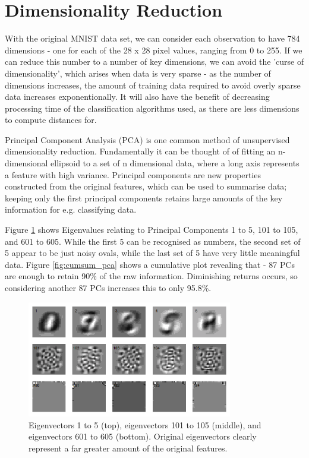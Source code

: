 \documentclass[11pt]{article} %
\begin{document}
\section{Dimensionality Reduction}

With the original MNIST data set, we can consider each observation to have 784 dimensions - one for each of the 28 x 28 pixel values, ranging from 0 to 255. If we can reduce this number to a number of key dimensions, we can avoid the 'curse of dimensionality', which arises when data is very sparse - as the number of dimensions increases, the amount of training data required to avoid overly sparse data increases exponentionally. It will also have the benefit of decreasing processing time of the classification algorithms used, as there are less dimensions to compute distances for. 

Principal Component Analysis (PCA) is one common method of unsupervised dimensionality reduction. Fundamentally it can be thought of of fitting an n-dimensional ellipsoid to a set of n dimensional data, where a long axis represents a feature with high variance. Principal components are new properties constructed from the original features, which can be used to summarise data; keeping only the first principal components retains large amounts of the key information for e.g. classifying  data. 

 Figure \ref{fig:pca_rotations_range} shows Eigenvalues relating to Principal Components 1 to 5, 101 to 105, and 601 to 605. While the first 5 can be recognised as numbers, the second set of 5 appear to be just noisy ovals, while the last set of 5 have very little meaningful data.  Figure \ref{fig:cumsum_pca} shows a cumulative plot revealing that - 87 PCs are enough to retain 90\% of the raw information. Diminishing returns occurs, so considering another 87 PCs increases this to only 95.8\%. 



\begin{figure}[htb!]
\includegraphics[width = 0.8\textwidth]{pca_rotations_wider_range.png}
\caption{Eigenvectors 1 to 5 (top), eigenvectors 101 to 105 (middle), and eigenvectors 601 to 605 (bottom). Original eigenvectors clearly represent a far greater amount of the original features.} 
\label{fig:pca_rotations_range}
\end{figure}
\end{document}
